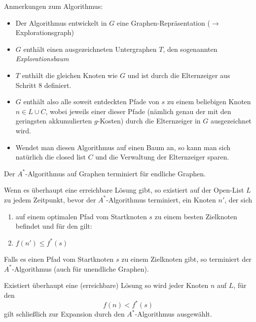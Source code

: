 \documentclass[runningheads,deutsch]{llncs}
\begin{document}
Anmerkungen zum Algorithmus:

\begin{itemize}
    \item Der Algorithmus entwickelt in $G$ eine Graphen-Repräsentation ($\rightarrow$ Explorationsgraph)
    \item $G$ enthält einen ausgezeichneten Untergraphen $T$, den sogenannten \textit{Explorationsbaum}
    \item $T$ enthält die gleichen Knoten wie $G$ und ist durch die Elternzeiger aus Schritt $8$ definiert.
    \item $G$ enthält also alle soweit entdeckten Pfade von $s$ zu einem beliebigen Knoten $n \in L \cup C$, wobei jeweils einer dieser Pfade (nämlich genau der mit den geringsten akkumulierten $g$-Kosten) durch die Elternzeiger in $G$ ausgezeichnet wird.
    \item Wendet man diesen Algorithmus auf einen Baum an, so kann man sich natürlich die closed list $C$ und die Verwaltung der Elternzeiger sparen.
\end{itemize}

\begin{lemma}
    Der $A^*$-Algorithmus auf Graphen terminiert für endliche Graphen.
\end{lemma}

\begin{lemma}
    Wenn es überhaupt eine erreichbare Lösung gibt,
    so existiert auf der Open-List $L$ zu jedem Zeitpunkt, bevor der $A^*$-Algorithmus terminiert, ein Knoten $n'$, der sich
    \begin{enumerate}
        \item auf einem optimalen Pfad vom Startknoten $s$ zu einem besten Zielknoten befindet und für den gilt:
        \item $f(n') \leq f^*(s)$
    \end{enumerate}
\end{lemma}

\begin{corollary}
    Falls es einen Pfad vom Startknoten $s$ zu einem Zielknoten gibt, so terminiert der $A^*$-Algorithmus (auch für unendliche Graphen).
\end{corollary}

\begin{corollary}
    Existiert überhaupt eine (erreichbare) Lösung so wird jeder Knoten $n$ auf $L$, für den
    \[ f(n) < f^*(s) \]
    gilt schließlich zur Expansion durch den $A^*$-Algorithmus ausgewählt.
\end{corollary}
\end{document}
